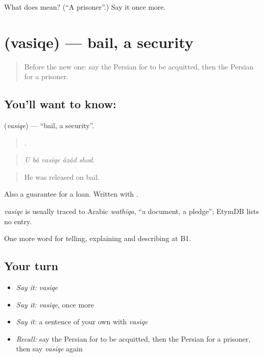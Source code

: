 \begin{tcolorbox}[breakable,colback=teal!4,colframe=teal!35!black,title={Before you move on}]
What does  mean? (\textquotedblleft{}A prisoner\textquotedblright{}.) Say it once more.
\end{tcolorbox}
\section[\texorpdfstring{\fa{وثیقه} (vasiqe)}{وثیقه (vasiqe)}]{ (vasiqe) — bail, a security}

\label{lesson:FA-C322-vasiqe}



\begin{quote}
Before the new one: say the Persian for to be acquitted, then the Persian for a prisoner.
\end{quote}

\subsection*{You'll want to know: }
\textbf{} (\emph{vasiqe}) — \textquotedblleft{}bail, a security\textquotedblright{}.

\begin{quote}
    .
\end{quote}

\begin{quote}
\emph{U bâ vasiqe âzâd shod.}
\end{quote}

\begin{quote}
He was released on bail.
\end{quote}

Also a guarantee for a loan. Written with .

\begin{cousinweb}
\emph{vasiqe} is usually traced to Arabic \emph{wathīqa}, \textquotedblleft{}a document, a pledge\textquotedblright{}; EtymDB lists no entry.
\end{cousinweb}

\begin{grammarlens}[title={What you've built}]
One more word for telling, explaining and describing at B1.
\end{grammarlens}

\subsection*{Your turn}
\begin{itemize}
\raggedright
  \item \emph{Say it:} \emph{vasiqe}
  \item \emph{Say it:} \emph{vasiqe}, once more
  \item \emph{Say it:} a sentence of your own with \emph{vasiqe}
  \item \emph{Recall:} say the Persian for to be acquitted, then the Persian for a prisoner, then say \emph{vasiqe} again
\end{itemize}

